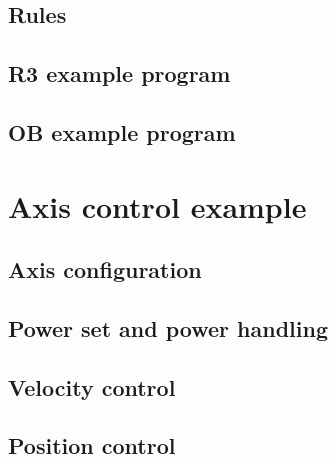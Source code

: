 %	
\subsection{Rules}

%	
\subsection{R3 example program}

%	
\subsection{OB example program}


\section{Axis control example}

%	
\subsection{Axis configuration}

%	
\subsection{Power set and power handling}

%	
\subsection{Velocity control}

%	
\subsection{Position control}




